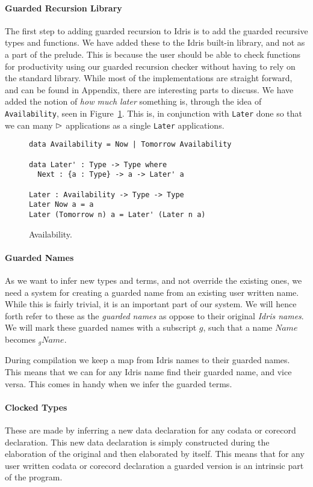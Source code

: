 \paragraph{Guarded Recursion Library}
The first step to adding guarded recursion to Idris is to add the guarded
recursive types and functions. We have added these to the Idris built-in
library, and not as a part of the prelude. This is because the user should be
able to check functions for productivity using our guarded recursion checker
without having to rely on the standard library.  While most of the
implementations are straight forward, and can be found in Appendix, there are interesting parts to discuss. We
have added the notion of \emph{how much later} something is, through the idea of
\texttt{Availability}, seen in Figure~\ref{fig:availability}. This is, in
conjunction with \texttt{Later} done so that we can many $\rhd$ applications
as a single \texttt{Later} applications.

\begin{figure}[h]
  \begin{lstlisting}[mathescape]
data Availability = Now | Tomorrow Availability

data Later' : Type -> Type where
  Next : {a : Type} -> a -> Later' a

Later : Availability -> Type -> Type
Later Now a = a
Later (Tomorrow n) a = Later' (Later n a)
\end{lstlisting}
  \caption{Availability.}
  \label{fig:availability}
\end{figure}

\paragraph{Guarded Names}
As we want to infer new types and terms, and not override the existing ones, we
need a system for creating a guarded name from an existing user written
name. While this is fairly trivial, it is an important part of our system. We
will hence forth refer to these as the \emph{guarded names} as oppose to their
original \emph{Idris names}. We will mark these guarded names with a subscript
$g$, such that a name $Name$ becomes $_gName$.

During compilation we keep a map from Idris names to their guarded names. This
means that we can for any Idris name find their guarded name, and vice
versa. This comes in handy when we infer the guarded terms.

\paragraph{Clocked Types}
These are made by inferring a new data declaration for any codata or corecord
declaration. This new data declaration is simply constructed during the
elaboration of the original and then elaborated by itself. This means that for
any user written codata or corecord declaration a guarded version is an
intrinsic part of the program. 

